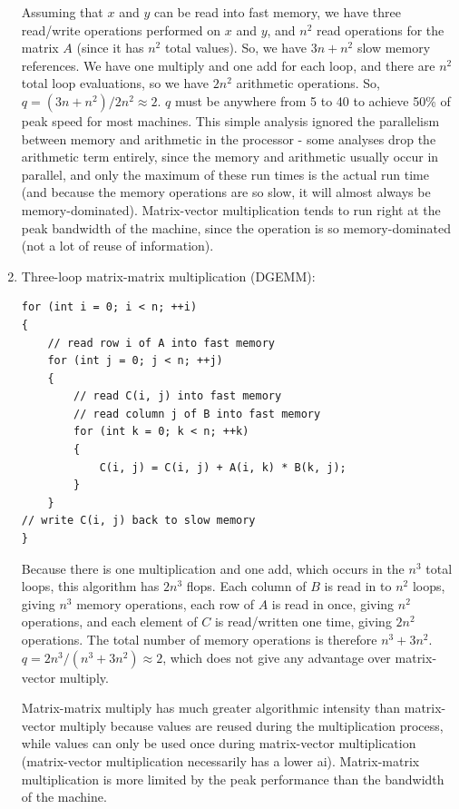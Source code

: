 \documentclass[10pt]{article}
\begin{document}
\begin{flushleft}
\begin{enumerate}
Assuming that \(x\) and \(y\) can be read into fast memory, we have three read/write operations performed on \(x\) and \(y\), and \(n^2\) read operations for the matrix \(A\) (since it has \(n^2\) total values). So, we have \(3n+n^2\) slow memory references. We have one multiply and one add for each loop, and there are \(n^2\) total loop evaluations, so we have \(2n^2\) arithmetic operations. So, \(q=(3n+n^2)/2n^2\approx2\). \(q\) must be anywhere from 5 to 40 to achieve 50\% of peak speed for most machines. This simple analysis ignored the parallelism between memory and arithmetic in the processor - some analyses drop the arithmetic term entirely, since the memory and arithmetic usually occur in parallel, and only the maximum of these run times is the actual run time (and because the memory operations are so slow, it will almost always be memory-dominated). Matrix-vector multiplication tends to run right at the peak bandwidth of the machine, since the operation is so memory-dominated (not a lot of reuse of information).

\item Three-loop matrix-matrix multiplication (DGEMM): 

\begin{lstlisting}
for (int i = 0; i < n; ++i)
{
	// read row i of A into fast memory
	for (int j = 0; j < n; ++j)
	{	
		// read C(i, j) into fast memory
		// read column j of B into fast memory
		for (int k = 0; k < n; ++k)
		{
			C(i, j) = C(i, j) + A(i, k) * B(k, j);
		}
	}
// write C(i, j) back to slow memory
}
\end{lstlisting}

Because there is one multiplication and one add, which occurs in the \(n^3\) total loops, this algorithm has \(2n^3\) flops. Each column of \(B\) is read in to \(n^2\) loops, giving \(n^3\) memory operations, each row of \(A\) is read in once, giving \(n^2\) operations, and each element of \(C\) is read/written one time, giving \(2n^2\) operations. The total number of memory operations is therefore \(n^3+3n^2\). \(q=2n^3/(n^3+3n^2)\approx 2\), which does not give any advantage over matrix-vector multiply.

Matrix-matrix multiply has much greater algorithmic intensity than matrix-vector multiply because values are reused during the multiplication process, while values can only be used once during matrix-vector multiplication (matrix-vector multiplication necessarily has a lower \gls{ai}). Matrix-matrix multiplication is more limited by the peak performance than the bandwidth of the machine.


\end{enumerate}
\end{flushleft}
\end{document}
